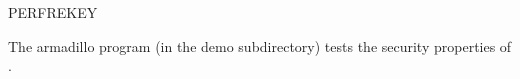 \begin{Layer}{PERFREKEY}
\begin{Sources}
\end{Sources}

\begin{GenEvent}
\end{GenEvent}

\begin{Testing}
\item 
The armadillo program (in the demo subdirectory) tests the security properties
of \ensemble.
\end{Testing}

\end{Layer}



